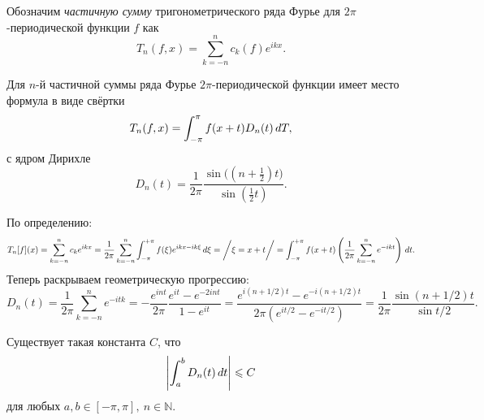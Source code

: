 
\begin{to_def}
    Обозначим \textit{частичную сумму} тригонометрического ряда Фурье для $2\pi$-периодической функции $f$ как
    \begin{equation*}
        T_n (f, x) = \sum_{k=-n}^n c_k (f) e^{ikx}.
    \end{equation*}
\end{to_def}

\begin{to_lem}
    Для $n$-й частичной суммы ряда Фурье $2\pi$-периодической функции имеет место формула в виде свёртки
    \begin{equation*}
        T_n (f, x) = \int_{-\pi}^{\pi} f(x+t) D_n (t) \, d T,
    \end{equation*}
    с ядром Дирихле
    \begin{equation*}
        D_n (t) = \frac{1}{2\pi} \frac{\sin \big(\left(n+\frac{1}{2}\right) t\big)}{\sin\left(\frac{1}{2} t\right)}.
    \end{equation*}
\end{to_lem}

\begin{uproof}
    По определению:
    \begin{equation*}
        T_n[f](x) = \sum_{k=-n}^{n} c_k e^{ikx}
        =
        \frac{1}{2\pi} \sum_{k=-n}^{n} \int_{-\pi}^{+\pi}
        f(\xi) e^{ikx-ik\xi} \, d \xi
        = \bigg/
            \xi = x + t
        \bigg/ = \int_{-\pi}^{+\pi} f(x+t) \left(
            \frac{1}{2\pi} \sum_{k=-n}^{n} e^{-ikt}
        \right) \, d t.
    \end{equation*}
    Теперь раскрываем геометрическую прогрессию:
    \begin{equation*}
        D_n (t) = \frac{1}{2\pi} \sum_{k=-n}^{n} e^{-itk} = 
        - \frac{e^{int}}{2\pi} \frac{e^{it}-e^{-2int}}{1 - e^{it}} = 
        \frac{e^{i(n+1/2)t}-e^{-i(n+1/2)t}}{2\pi \left(e^{it/2}-e^{-it/2}\right)} = 
        \frac{1}{2\pi} \frac{\sin(n+1/2)t}{\sin t/2}.
    \end{equation*}
\end{uproof}


\begin{to_lem}
    Существует такая константа $C$, что 
    \begin{equation*}
        \left|
        \int_a^b D_n (t) \, d t
        \right| \leqslant C
    \end{equation*}
    для любых $a, b \in [-\pi, \pi], \ n \in \mathbb{N}$.
\end{to_lem}


